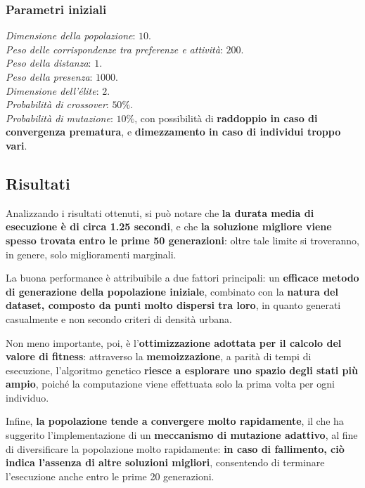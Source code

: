 \documentclass{CSUniSchoolLabReport}
\begin{document}
\subsubsection{Parametri iniziali}

\textit{Dimensione della popolazione}: $10$. \\
\textit{Peso delle corrispondenze tra preferenze e attività}: $200$. \\
\textit{Peso della distanza}: $1$. \\
\textit{Peso della presenza}: $1000$. \\
\textit{Dimensione dell'élite}: $2$. \\
\textit{Probabilità di crossover}: $50\%$. \\
\textit{Probabilità di mutazione}: $10\%$, con possibilità di \textbf{raddoppio in caso di convergenza prematura}, e \textbf{dimezzamento in caso di individui troppo vari}.

\pagebreak{}

\subsection{Risultati}

Analizzando i risultati ottenuti, si può notare che \textbf{la durata media di esecuzione è di circa 1.25 secondi}, e che \textbf{la soluzione migliore viene spesso trovata entro le prime 50 generazioni}: oltre tale limite si troveranno, in genere, solo miglioramenti marginali.

La buona performance è attribuibile a due fattori principali: un \textbf{efficace metodo di generazione della popolazione iniziale}, combinato con la \textbf{natura del dataset, composto da punti molto dispersi tra loro}, in quanto generati casualmente e non secondo criteri di densità urbana.

Non meno importante, poi, è l'\textbf{ottimizzazione adottata per il calcolo del valore di fitness}: attraverso la \textbf{memoizzazione}, a parità di tempi di esecuzione, l'algoritmo genetico \textbf{riesce a esplorare uno spazio degli stati più ampio}, poiché la computazione viene effettuata solo la prima volta per ogni individuo.

Infine, \textbf{la popolazione tende a convergere molto rapidamente}, il che ha suggerito l'implementazione di un \textbf{meccanismo di mutazione adattivo}, al fine di diversificare la popolazione molto rapidamente: \textbf{in caso di fallimento, ciò indica l'assenza di altre soluzioni migliori}, consentendo di terminare l'esecuzione anche entro le prime 20 generazioni. \\
\end{document}
